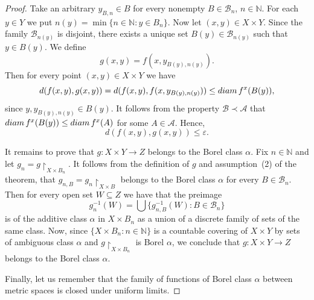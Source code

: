 \documentclass[10pt,a4paper]{amsart}
\begin{document}
\begin{proof}
	Take an arbitrary $y_{B,n}\in B$ for every nonempty $B\in\mathcal B_n$, $n\in \mathbb N$. For each $y\in Y$ we put $n(y)=\min\{n\in\mathbb N: y\in B_n\}$. Now let $(x,y)\in X\times Y$. Since the family $\mathcal B_{n(y)}$ is disjoint, there exists a unique set $B(y)\in\mathcal B_{n(y)}$ such that $y\in B(y)$. We define
	$$
	g(x,y)=f(x,y_{B(y),n(y)}).
	$$
	Then for every point $(x,y)\in X\times Y$ we have 
	$$
	d(f(x,y),g(x,y))=d(f(x,y), f(x,y_{B(y),n(y)}))\le {\rm diam}\, f^x(B(y)),
	$$
	since $y, y_{B(y),n(y)}\in B(y)$. It follows from the property $\mathcal B\prec\mathcal A$ that ${\rm diam}\, f^x(B(y))\le {\rm diam}\, f^x(A)$ for some $A\in\mathcal A$. Hence,
	$$
		d(f(x,y),g(x,y))\le\varepsilon.
	$$

It remains to prove that $g\colon X\times Y\to Z$ belongs to the Borel class $\alpha$. Fix $n\in\mathbb N$ and let 
$g_n=g\restriction_{X\times B_n}$. It follows from the definition of $g$ and assumption~(2) of the theorem, that $g_{n,B}=g_n\restriction_{X\times B}$ belongs to the Borel class $\alpha$ for every $B\in\mathcal B_n$. Then for every open set $W\subseteq Z$ we have that the preimage
$$
g_n^{-1}(W)=\bigcup\{g_{n,B}^{-1}(W):B\in\mathcal B_n\}
$$
is of the additive class $\alpha$ in $X\times B_n$ as a union of a discrete family of sets of the same class. Now, since $\{X\times B_n:n\in\mathbb N\}$ is a countable covering of $X\times Y$ by sets of ambiguous class $\alpha$ and $g\restriction_{X\times B_n}$ is Borel $\alpha$, we conclude that $g\colon X\times Y\to Z$ belongs to the Borel class $\alpha$.

	Finally, let us remember that the family of functions of Borel class $\alpha$ between metric spaces is closed under uniform limits.	 
\end{proof}
\end{document}
